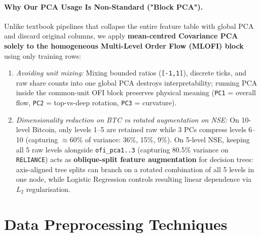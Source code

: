 \documentclass[12pt,a4paper,oneside]{report}
\newcommand{\code}[1]{\texttt{#1}}
\begin{document}
\paragraph{Why Our PCA Usage Is Non-Standard ("Block PCA").} Unlike textbook pipelines that collapse the entire feature table with global PCA and discard original columns, we apply \textbf{mean-centred Covariance PCA solely to the homogeneous Multi-Level Order Flow (MLOFI) block} using only training rows:
\begin{enumerate}
  \item \emph{Avoiding unit mixing:} Mixing bounded ratios (\code{[-1,1]}), discrete ticks, and raw share counts into one global PCA destroys interpretability; running PCA inside the common-unit OFI block preserves physical meaning (\code{PC1} = overall flow, \code{PC2} = top-vs-deep rotation, \code{PC3} = curvature).
  \item \emph{Dimensionality reduction on BTC vs rotated augmentation on NSE:} On 10-level Bitcoin, only levels 1--5 are retained raw while 3 PCs compress levels 6--10 (capturing $\approx 60\%$ of variance: 36\%, 15\%, 9\%). On 5-level NSE, keeping all 5 raw levels alongside \code{ofi\_pca1..3} (capturing 80.5\% variance on \code{RELIANCE}) acts as \textbf{oblique-split feature augmentation} for decision trees: axis-aligned tree splits can branch on a rotated combination of all 5 levels in one node, while Logistic Regression controls resulting linear dependence via $L_2$ regularisation.
\end{enumerate}

\section{Data Preprocessing Techniques}
\end{document}
